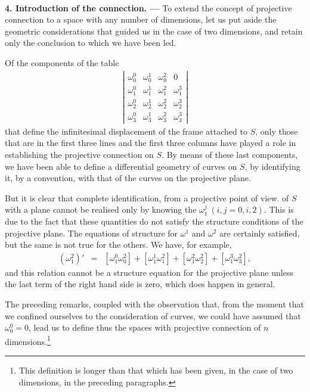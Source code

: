 
\ \\

{\bf 4. Introduction of the connection. --- }
% 
To extend the concept of projective connection to a space with any number of dimensions, let us put aside the geometric considerations that guided us in the case of two dimensions, and retain only the conclusion to which we have been led.

Of the components of the table 
\begin{eqnarray*}
\left|
\begin{array}{cccc}
\omega^0_0  &  \omega^1_0 & \omega^2_0 & 0  \\
 \omega^0_1  &  \omega^1_1 & \omega^2_1 & \omega^3_1  \\
\omega^0_2  &  \omega^1_2 & \omega^2_2 & \omega^3_2  \\
\omega^0_3  &  \omega^1_3 & \omega^2_3 & \omega^3_3 
\end{array}
\right|
\end{eqnarray*}
that define the infinitesimal displacement of the frame attached to $S$, only those that are in the first three lines and the first three columns have played a role in establishing the projective connection on $S$. By means of these last components, we have been able to define a differential geometry of curves on $S$, by identifying it, by a  convention, with that of the curves on the projective plane.

But it is clear that complete identification, from a projective point of view. of $S$ with a plane cannot be realised only by knowing the $\omega^j_1\ (i,j = 0, i, 2)$. This is due to the fact that these quantities do not satisfy the structure conditions of the projective plane. The equations of structure for $\omega^1$ and $\omega^2$ are certainly satisfied, but the same is not true for the others. We have, for example,
\begin{eqnarray*}
(\omega^2_1)' &=& [\omega^0_1 \omega^2_0] + [\omega^1_1 \omega^2_1] +[\omega^2_1 \omega^2_2] +[\omega^3_1 \omega^2_3] , 
\end{eqnarray*}
and this relation cannot be a structure equation for the projective plane unless the last term of the right hand side is zero, which does  happen in general.

The preceding remarks, coupled with the observation that, from the moment that we confined ourselves to the consideration of curves, we could have assumed that $\omega^0_0 = 0$, lead us to define thus the spaces with projective connection of $n$ dimensions.\footnote{This definition is longer than that which has been given, in the case of two dimensions, in the preceding paragraphs.}


